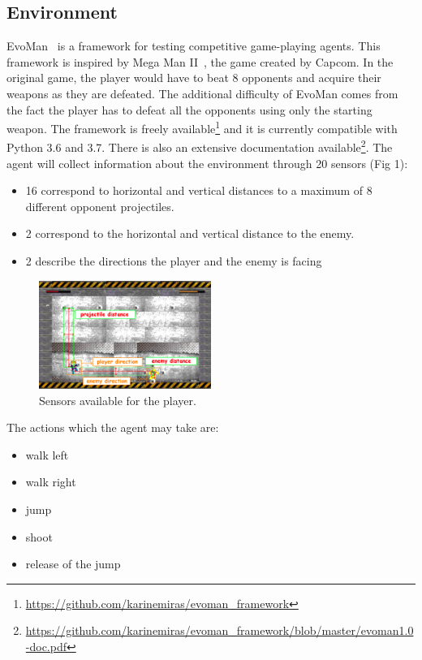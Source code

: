 \documentclass[conference]{IEEEtran}
\begin{document}
    \subsection{Environment}\label{subsec:environment}

    EvoMan~\cite{karinemiras,evoman} is a framework for testing competitive game-playing agents.
    This framework is inspired by Mega Man II~\cite{capcom}, the game created by Capcom.
    In the original game, the player would have to beat $8$ opponents and acquire their weapons
    as they are defeated.
    The additional difficulty of EvoMan comes from the fact the player has to defeat all
    the opponents using only the starting weapon.
    The framework is freely available\footnote{\url{https://github.com/karinemiras/evoman\_framework}}
    and it is currently compatible with Python 3.6 and 3.7.
    There is also an extensive documentation
    available\footnote{\url{https://github.com/karinemiras/evoman\_framework/blob/master/evoman1.0-doc.pdf}}.
    The agent will collect information about the environment through 20 sensors (Fig 1):
    \begin{itemize}
        \item 16 correspond to horizontal and vertical distances to a maximum of 8 different opponent projectiles.
        \item 2 correspond to the horizontal and vertical distance to the enemy.
        \item 2 describe the directions the player and the enemy is facing
    \end{itemize}
    \begin{figure}
        \centering
        \includegraphics[width=0.5\textwidth]{images/Evoman3.png}
        \caption{Sensors available for the player.}
        \label{fig:sensors}
    \end{figure}
    The actions which the agent may take are:
    \begin{itemize}
        \item walk left
        \item walk right
        \item jump
        \item shoot
        \item release of the jump
    \end{itemize}
\end{document}
